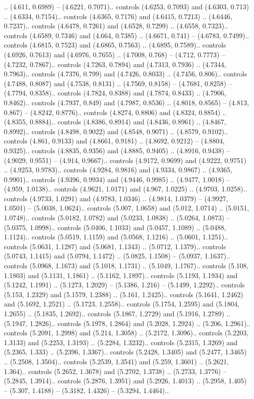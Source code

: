 .. (4.611, 0.6989) -- (4.6221, 0.7071).. controls (4.6253, 0.7093) and (4.6303, 0.713) .. (4.6334, 0.7154).. controls (4.6365, 0.7176) and (4.6415, 0.7213) .. (4.6446, 0.7237).. controls (4.6478, 0.7261) and (4.6528, 0.7299) .. (4.6558, 0.7323).. controls (4.6589, 0.7346) and (4.664, 0.7385) .. (4.6671, 0.741) -- (4.6783, 0.7499).. controls (4.6815, 0.7523) and (4.6865, 0.7563) .. (4.6895, 0.7589).. controls (4.6926, 0.7613) and (4.6976, 0.7655) .. (4.7008, 0.768) -- (4.712, 0.7773) -- (4.7232, 0.7867).. controls (4.7263, 0.7894) and (4.7313, 0.7936) .. (4.7344, 0.7963).. controls (4.7376, 0.799) and (4.7426, 0.8033) .. (4.7456, 0.806).. controls (4.7488, 0.8087) and (4.7538, 0.8131) .. (4.7569, 0.8158) -- (4.7681, 0.8258) -- (4.7794, 0.8358).. controls (4.7824, 0.8388) and (4.7874, 0.8433) .. (4.7906, 0.8462).. controls (4.7937, 0.849) and (4.7987, 0.8536) .. (4.8018, 0.8565) -- (4.813, 0.867) -- (4.8242, 0.8776).. controls (4.8274, 0.8806) and (4.8324, 0.8854) .. (4.8355, 0.8884).. controls (4.8386, 0.8914) and (4.8436, 0.8961) .. (4.8467, 0.8992).. controls (4.8498, 0.9022) and (4.8548, 0.9071) .. (4.8579, 0.9102).. controls (4.861, 0.9133) and (4.8661, 0.9181) .. (4.8692, 0.9212) -- (4.8804, 0.9325).. controls (4.8835, 0.9356) and (4.8885, 0.9405) .. (4.8916, 0.9438) -- (4.9029, 0.9551) -- (4.914, 0.9667).. controls (4.9172, 0.9699) and (4.9222, 0.9751) .. (4.9253, 0.9783).. controls (4.9284, 0.9816) and (4.9334, 0.9867) .. (4.9365, 0.9901).. controls (4.9396, 0.9934) and (4.9446, 0.9985) .. (4.9477, 1.0018) -- (4.959, 1.0138).. controls (4.9621, 1.0171) and (4.967, 1.0225) .. (4.9703, 1.0258).. controls (4.9733, 1.0291) and (4.9783, 1.0346) .. (4.9814, 1.0379) -- (4.9927, 1.0501) -- (5.0038, 1.0624).. controls (5.007, 1.0658) and (5.012, 1.0714) .. (5.0151, 1.0748).. controls (5.0182, 1.0782) and (5.0233, 1.0838) .. (5.0264, 1.0873) -- (5.0375, 1.0998).. controls (5.0406, 1.1033) and (5.0457, 1.1089) .. (5.0488, 1.1124).. controls (5.0519, 1.1159) and (5.0568, 1.1216) .. (5.0601, 1.1251).. controls (5.0631, 1.1287) and (5.0681, 1.1343) .. (5.0712, 1.1379).. controls (5.0743, 1.1415) and (5.0794, 1.1472) .. (5.0825, 1.1508) -- (5.0937, 1.1637).. controls (5.0968, 1.1673) and (5.1018, 1.1731) .. (5.1049, 1.1767).. controls (5.108, 1.1803) and (5.1131, 1.1861) .. (5.1162, 1.1897).. controls (5.1193, 1.1934) and (5.1242, 1.1991) .. (5.1273, 1.2029) -- (5.1386, 1.216) -- (5.1499, 1.2292).. controls (5.153, 1.2329) and (5.1579, 1.2388) .. (5.161, 1.2425).. controls (5.1641, 1.2462) and (5.1692, 1.2521) .. (5.1723, 1.2558).. controls (5.1754, 1.2595) and (5.1804, 1.2655) .. (5.1835, 1.2692).. controls (5.1867, 1.2729) and (5.1916, 1.2789) .. (5.1947, 1.2826).. controls (5.1978, 1.2864) and (5.2028, 1.2924) .. (5.206, 1.2961).. controls (5.2091, 1.2998) and (5.214, 1.3058) .. (5.2172, 1.3096).. controls (5.2203, 1.3133) and (5.2253, 1.3193) .. (5.2284, 1.3232).. controls (5.2315, 1.3269) and (5.2365, 1.333) .. (5.2396, 1.3367).. controls (5.2428, 1.3405) and (5.2477, 1.3465) .. (5.2508, 1.3504).. controls (5.2539, 1.3541) and (5.259, 1.3601) .. (5.2621, 1.364).. controls (5.2652, 1.3678) and (5.2702, 1.3738) .. (5.2733, 1.3776) -- (5.2845, 1.3914).. controls (5.2876, 1.3951) and (5.2926, 1.4013) .. (5.2958, 1.405) -- (5.307, 1.4188) -- (5.3182, 1.4326) -- (5.3294, 1.4464).. 